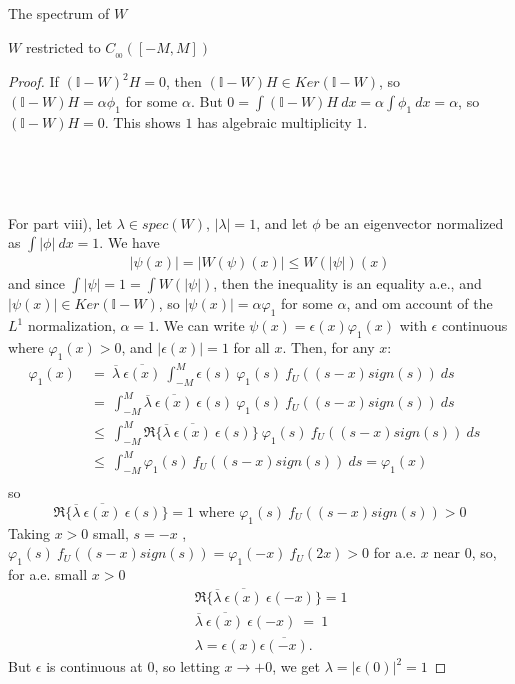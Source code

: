 \documentclass[12pt]{article}
\begin{document}
\begin{section}{The spectrum of $W$ }
\begin{subsection}{$W$ restricted to $C_{_{0\!0}}([-M,M])$}
\begin{proof}
If $(\mathbb{I} - W)^2 H = 0$, then $(\mathbb{I} - W) H \in Ker(\mathbb{I} - W)$, so $(\mathbb{I} - W) H = \alpha \phi_1$ for some $\alpha$. But $0 = \int (\mathbb{I} - W) H \ dx = \alpha \int \phi_1 \ dx = \alpha $, so $(\mathbb{I} - W) H = 0$. This shows $1$ has algebraic multiplicity $1$.

\

\

For part viii), let $\lambda \in spec(W)$, $|\lambda|=1$, and let $\phi$ be an eigenvector normalized as $\int |\phi| \ dx = 1$. We have
\begin{align*}
|\psi(x)| = \left|W(\psi)(x)\right| \le W(|\psi|)(x) 
\end{align*}
and since $\int |\psi| = 1 = \int W(|\psi|)$, then the inequality is an equality a.e., and $|\psi(x)| \in Ker(\mathbb{I}-W)$, so $|\psi(x)| = \alpha \varphi_1$ for some $\alpha$, and om account of the $L^1$ normalization, $\alpha=1$. We can write  $\psi(x) = \epsilon(x) \varphi_1(x)$ with $\epsilon$ continuous where $\varphi_1(x)>0$, and $|\epsilon(x)| = 1$ for all $x$. Then, for any $x$:
\begin{align*}
\varphi_1(x) &~=~ \overline{\lambda} \ \overline{\epsilon(x)} \ 
\int_{-M}^{M}  \epsilon(s) \ \varphi_1(s) \ f_U\!( (s-x)sign(s) )\ ds &\\
&~=~ 
\int_{-M}^{M}  \overline{\lambda} \ \overline{\epsilon(x)} \ \epsilon(s) \ \varphi_1(s) \ f_U\!( (s-x)sign(s) )\ ds  &\\
 &~\le~ \int_{-M}^{M}  \Re{\Big\{\overline{\lambda} \ \overline{\epsilon(x)} \ \epsilon(s) \Big\} } \ \varphi_1(s) \ f_U\!( (s-x)sign(s) )\ ds  &\\
 &~\le~ \int_{-M}^{M}  \varphi_1(s) \ f_U\!( (s-x)sign(s) )\ ds =  \varphi_1(x) &\\
\end{align*}
so 
$$
\Re{\Big\{\overline{\lambda} \ \overline{\epsilon(x)} \ \epsilon(s) \Big\} } = 1 \text{ where } \varphi_1(s) \ f_U\!( (s-x)sign(s) ) > 0
$$
Taking $x > 0$ small, $s = -x$ , $ \varphi_1(s) \ f_U\!( (s-x)sign(s) ) = \varphi_1(-x) \ f_U\!( 2x ) > 0 $ for a.e. $x$ near $0$, so, for a.e. small $x>0$
\begin{align*}
&& &\Re{\Big\{\overline{\lambda} \ \overline{\epsilon(x)} \ \epsilon(-x) \Big\} } = 1 &\\
&& &\overline{\lambda} \ \overline{\epsilon(x)} \ \epsilon(-x)  ~=~ 1 &\\
&& &\lambda = \epsilon(x) \overline{\epsilon(-x)}. &
\end{align*}
But $\epsilon$ is continuous at $0$, so letting $x \rightarrow +0$, we get  $\lambda = |\epsilon(0)|^2 = 1$


\end{proof}
\end{subsection}
\end{section}
\end{document}
